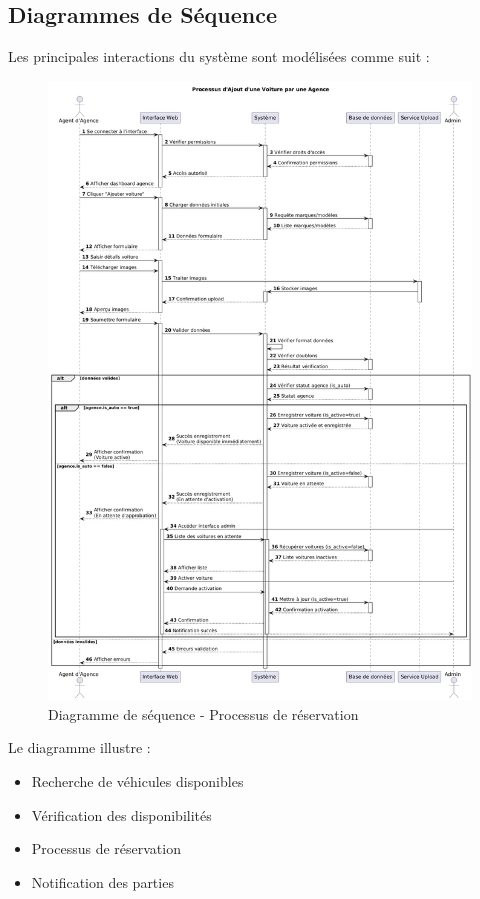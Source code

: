 \subsection{Diagrammes de Séquence}
Les principales interactions du système sont modélisées comme suit :

\begin{figure}[h!]
    \centering
    \includegraphics[width=1\textwidth]{docs/rapport/sequence.png}
    \caption{Diagramme de séquence - Processus de réservation}
    \label{fig:sequence_diagram}
\end{figure}

Le diagramme illustre :
\begin{itemize}
    \item Recherche de véhicules disponibles
    \item Vérification des disponibilités
    \item Processus de réservation
    \item Notification des parties
\end{itemize}

